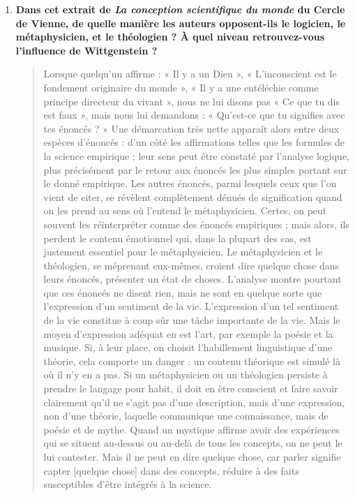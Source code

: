 \begin{enumerate}[label=\arabic*.,leftmargin=1.6em]
\item \textbf{Dans cet extrait de \textit{La conception scientifique du monde} du Cercle de Vienne, de quelle manière les auteurs opposent-ils le logicien, le métaphysicien, et le théologien ? À quel niveau retrouvez-vous l’influence de Wittgenstein ?}
\begin{quote}\small
Lorsque quelqu’un affirme : « Il y a un Dieu », « L’inconscient est le fondement originaire du monde », « Il y a une entéléchie comme principe directeur du vivant », nous ne lui disons pas « Ce que tu dis est faux », mais nous lui demandons : « Qu’est-ce que tu signifies avec tes énoncés ? » Une démarcation très nette apparaît alors entre deux espèces d’énoncés : d’un côté les affirmations telles que les formules de la science empirique ; leur sens peut être constaté par l’analyse logique, plus précisément par le retour aux énoncés les plus simples portant sur le donné empirique. Les autres énoncés, parmi lesquels ceux que l’on vient de citer, se révèlent complètement dénués de signification quand on les prend au sens où l’entend le métaphysicien. Certes, on peut souvent les réinterpréter comme des énoncés empiriques ; mais alors, ils perdent le contenu émotionnel qui, dans la plupart des cas, est justement essentiel pour le métaphysicien. Le métaphysicien et le théologien, se méprenant eux-mêmes, croient dire quelque chose dans leurs énoncés, présenter un état de choses. L’analyse montre pourtant que ces énoncés ne disent rien, mais ne sont en quelque sorte que l’expression d’un sentiment de la vie. L’expression d’un tel sentiment de la vie constitue à coup sûr une tâche importante de la vie. Mais le moyen d’expression adéquat en est l’art, par exemple la poésie et la musique. Si, à leur place, on choisit l’habillement linguistique d’une théorie, cela comporte un danger : un contenu théorique est simulé là où il n’y en a pas. Si un métaphysicien ou un théologien persiste à prendre le langage pour habit, il doit en être conscient et faire savoir clairement qu’il ne s’agit pas d’une description, mais d’une expression, non d’une théorie, laquelle communique une connaissance, mais de poésie et de mythe. Quand un mystique affirme avoir des expériences qui se situent au-dessus ou au-delà de tous les concepts, on ne peut le lui contester. Mais il ne peut en dire quelque chose, car parler signifie capter [quelque chose] dans des concepts, réduire à des faits susceptibles d’être intégrés à la science.
\end{quote}
\end{enumerate}

